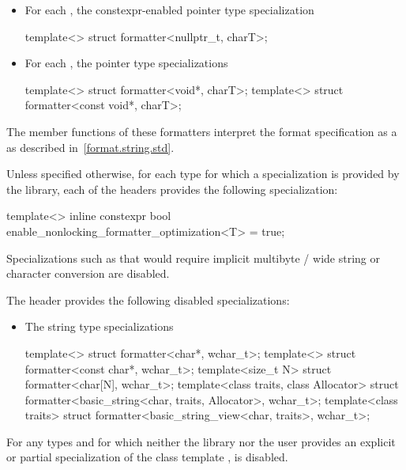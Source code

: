 \begin{itemize}
\item
{}%
%
For each ,
the constexpr-enabled pointer type specialization
\begin{codeblock}
template<> struct formatter<nullptr_t, charT>;
\end{codeblock}

\item
For each ,
the pointer type specializations
\begin{codeblock}
template<> struct formatter<void*, charT>;
template<> struct formatter<const void*, charT>;
\end{codeblock}
\end{itemize}
The  member functions of these formatters
interpret the format specification
as a 
as described in~\ref{format.string.std}.

\pnum
Unless specified otherwise, for each type  for which
a  specialization is provided by the library,
each of the headers provides the following specialization:
\begin{codeblock}
template<> inline constexpr bool enable_nonlocking_formatter_optimization<T> = true;
\end{codeblock}
\begin{note}
Specializations such as 
that would require implicit
multibyte / wide string or character conversion are disabled.
\end{note}

\pnum
The header  provides
the following disabled specializations:
\begin{itemize}
\item
The string type specializations
\begin{codeblock}
template<> struct formatter<char*, wchar_t>;
template<> struct formatter<const char*, wchar_t>;
template<size_t N> struct formatter<char[N], wchar_t>;
template<class traits, class Allocator>
  struct formatter<basic_string<char, traits, Allocator>, wchar_t>;
template<class traits>
  struct formatter<basic_string_view<char, traits>, wchar_t>;
\end{codeblock}
\end{itemize}

\pnum
For any types  and  for which
neither the library nor the user provides
an explicit or partial specialization of
the class template ,
 is disabled.

